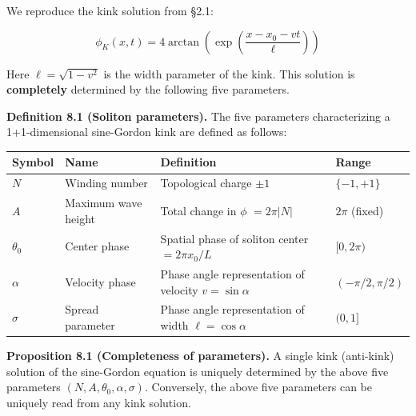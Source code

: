 \documentclass[a4paper,11pt]{article}
\newcounter{none}
\begin{document}
We reproduce the kink solution from §2.1:

\[\phi_K(x, t) = 4\arctan\left(\exp\left(\frac{x - x_0 - vt}{\ell}\right)\right)\]

Here \(\ell = \sqrt{1 - v^2}\) is the width parameter of the kink. This
solution is \textbf{completely} determined by the following five
parameters.

\textbf{Definition 8.1 (Soliton parameters).} The five parameters
characterizing a 1+1-dimensional sine-Gordon kink are defined as
follows:

{\def\LTcaptype{none} %
\begin{longtable}[]{@{}
  >{\centering\arraybackslash}p{}
  >{\centering\arraybackslash}p{}
  >{\centering\arraybackslash}p{}
  >{\centering\arraybackslash}p{}@{}}
\toprule\noalign{}
\begin{minipage}[b]{\linewidth}\centering
Symbol
\end{minipage} & \begin{minipage}[b]{\linewidth}\centering
Name
\end{minipage} & \begin{minipage}[b]{\linewidth}\centering
Definition
\end{minipage} & \begin{minipage}[b]{\linewidth}\centering
Range
\end{minipage} \\
\midrule\noalign{}
\endhead
\bottomrule\noalign{}
\endlastfoot
\(N\) & Winding number & Topological charge \(\pm 1\) &
\(\{-1, +1\}\) \\
\(A\) & Maximum wave height & Total change in \(\phi\) \(= 2\pi |N|\) &
\(2\pi\) (fixed) \\
\(\theta_0\) & Center phase & Spatial phase of soliton center
\(= 2\pi x_0 / L\) & \([0, 2\pi)\) \\
\(\alpha\) & Velocity phase & Phase angle representation of velocity
\(v = \sin\alpha\) & \((-\pi/2, \pi/2)\) \\
\(\sigma\) & Spread parameter & Phase angle representation of width
\(\ell = \cos\alpha\) & \((0, 1]\) \\
\end{longtable}
}

\textbf{Proposition 8.1 (Completeness of parameters).} A single kink
(anti-kink) solution of the sine-Gordon equation is uniquely determined
by the above five parameters \((N, A, \theta_0, \alpha, \sigma)\).
Conversely, the above five parameters can be uniquely read from any kink
solution.
\end{document}
